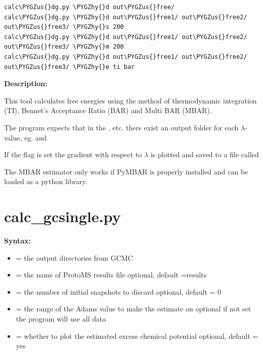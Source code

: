 \documentclass[letterpaper,10pt,english]{sphinxmanual}
\def\PYGZus{\char`\_}
\def\PYGZhy{\char`\-}
\begin{document}
\begin{Verbatim}[commandchars=\\\{\}]
calc\PYGZus{}dg.py \PYGZhy{}d out\PYGZus{}free/
calc\PYGZus{}dg.py \PYGZhy{}d out\PYGZus{}free1/ out\PYGZus{}free2/ out\PYGZus{}free3/ \PYGZhy{}s 200
calc\PYGZus{}dg.py \PYGZhy{}d out\PYGZus{}free1/ out\PYGZus{}free2/ out\PYGZus{}free3/ \PYGZhy{}m 200
calc\PYGZus{}dg.py \PYGZhy{}d out\PYGZus{}free1/ out\PYGZus{}free2/ out\PYGZus{}free3/ \PYGZhy{}e ti bar
\end{Verbatim}

\textbf{Description:}

This tool calculates free energies using the method of thermodynamic integration (TI), Bennet's Acceptance Ratio (BAR) and Multi BAR (MBAR).

The program expects that in the ,  etc. there exist an output folder for each \(\lambda\)-value, eg.  and 

If the  flag is set the gradient with respect to \(\lambda\) is plotted and saved to a file called 

The MBAR estimator only works if PyMBAR is properly installed and can be loaded as a python library.


\section{calc\_gcsingle.py}
\label{tools:calc-gcsingle-py}
\textbf{Syntax:}

\begin{itemize}
\item {} 
 = the output directories from GCMC

\item {} 
 = the name of ProtoMS results file
optional, default =results

\item {} 
 = the number of initial snapshots to discard
optional, default = 0

\item {} 
 = the range of the Adams value to make the estimate on
optional
if not set the program will use all data

\item {} 
 = whether to plot the estimated excess chemical potential
optional, default = yes

\end{itemize}
\end{document}
